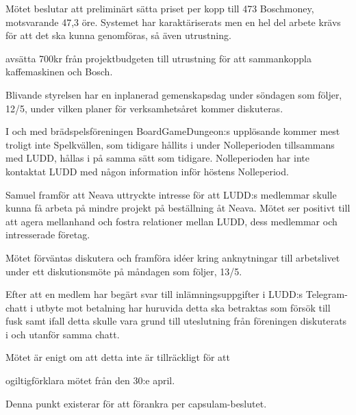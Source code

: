 \documentclass{protokoll}
\begin{document}
Mötet beslutar att preliminärt sätta priset per kopp till 473 Boschmoney,
motsvarande 47,3 öre.
 Systemet har karaktäriserats men en hel del arbete krävs för att det ska kunna
 genomföras, så även utrustning.
\begin{beslut}
  \att avsätta 700kr från projektbudgeten till utrustning för att sammankoppla
  kaffemaskinen och Bosch.
\end{beslut}
Blivande styrelsen har en inplanerad gemenskapsdag under söndagen som följer,
12/5, under vilken planer för verksamhetsåret kommer diskuteras. 

I och med brädspelsföreningen BoardGameDungeon:s upplösande kommer mest troligt 
inte Spelkvällen, som tidigare hållits i under Nolleperioden tillsammans med 
LUDD, hållas i på samma sätt som tidigare. Nolleperioden har inte kontaktat
LUDD med någon information inför höstens Nolleperiod.


Samuel framför att Neava uttryckte intresse för att LUDD:s medlemmar skulle
kunna få arbeta på mindre projekt på beställning åt Neava. Mötet ser positivt
till att agera mellanhand och fostra relationer mellan LUDD, dess medlemmar och
intresserade företag. 

Mötet förväntas diskutera och framföra idéer kring anknytningar till
arbetslivet under ett diskutionsmöte på måndagen som följer, 13/5.

Efter att en medlem har begärt svar till inlämningsuppgifter i LUDD:s
Telegram-chatt i utbyte mot betalning har huruvida detta ska betraktas som
försök till fusk samt ifall detta skulle vara grund till uteslutning från
föreningen diskuterats i och utanför samma chatt. 

Mötet är enigt om att detta inte är tillräckligt för att

\begin{beslut}
  \att ogiltigförklara mötet från den 30:e april.
\end{beslut}
Denna punkt existerar för att förankra per capsulam-beslutet. 
\end{document}
